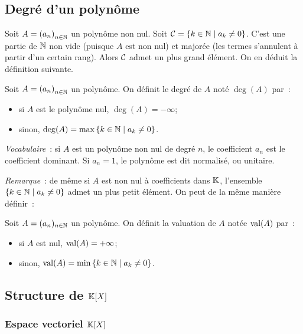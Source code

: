 \subsection{Degré d'un polynôme}

Soit \(A = {(a_n)}_{n \in \mathbb{N}}\) un polynôme non nul. Soit \(\mathcal{C} = \left\{k \in
\mathbb{N}\mathrel{}\middle|\mathrel{}a_k \neq 0\right\}\). C'est une partie de \(\mathbb{N}\) non vide (puisque \(A\) est non
nul) et majorée (les termes s'annulent à partir d'un certain rang). Alors
\(\mathcal{C}\) admet un plus grand élément. On en déduit la définition suivante.

\begin{defdef}
  Soit \(A = {(a_n)}_{n \in \mathbb{N}}\) un polynôme. On définit le degré de \(A\) noté
  \(\deg(A)\) par~:
  \begin{itemize}
    \item si \(A\) est le polynôme nul, \(\deg(A) = -\infty\);
    \item sinon, \(\deg(A) = \max \left\{k \in \mathbb{N}\mathrel{}\middle|\mathrel{}a_k \neq 0\right\}\).
  \end{itemize}
\end{defdef}

\emph{Vocabulaire}~: si \(A\) est un polynôme non nul de degré \(n\), le
coefficient \(a_n\) est le coefficient dominant. Si \(a_n = 1\), le polynôme est
dit normalisé, ou unitaire.

\emph{Remarque}~: de même si \(A\) est non nul à coefficients dans \(\mathbb{K}\),
l'ensemble \(\left\{k \in \mathbb{N}\mathrel{}\middle|\mathrel{}a_k \neq 0\right\}\) admet un plus petit élément. On peut
de la même manière définir~:

Soit \(A = (a_n)_{n \in \mathbb{N}}\) un polynôme. On définit la valuation de \(A\) notée
\(\operatorname{val}(A)\) par~:
\begin{itemize}
  \item si \(A\) est nul, \(\operatorname{val}(A) = +\infty\);
  \item sinon, \(\operatorname{val}(A) = \min \left\{k \in \mathbb{N}\mathrel{}\middle|\mathrel{}a_k \neq 0\right\}\).
\end{itemize}


\subsection{Structure de \(\mathbb{K}[X]\)}

\subsubsection{Espace vectoriel \(\mathbb{K}[X]\)}

